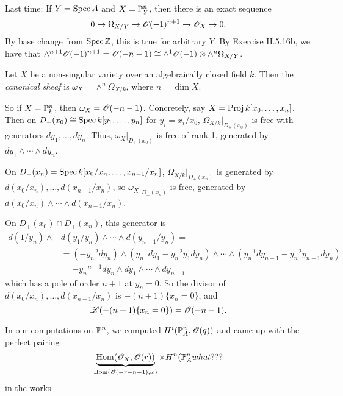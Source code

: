  \setcounter{lecture}{18}

 Last time: If $Y=\spec A$ and $X=\P^n_Y$, then there is an exact
 sequence
 \[
    0\to \Omega_{X/Y} \to \O(-1)^{n+1} \to \O_X\to 0.
 \]
  By base change from $\spec \Z$, this is true for arbitrary $Y$.
  By Exercise II.5.16b, we have that $\wedge^{n+1}\O(-1)^{n+1} =
  \O(-n-1)\cong \wedge^1 \O(-1)\otimes \wedge^n
  \Omega_{X/Y}$.

  \begin{definition}
  Let $X$ be a non-singular variety over an algebraically closed
  field $k$.  Then the \emph{canonical sheaf} is $\omega_X =
  \wedge^n\Omega_{X/k}$, where $n=\dim X$.
  \end{definition}

 So if $X=\P^n_k$, then $\omega_X=\O(-n-1)$.  Concretely, say
 $X=\proj k[x_0,\dots,x_n]$.  Then on $D_+(x_0)\cong \spec
 k[y_1,\dots,y_n]$ for $y_i=x_i/x_0$, $\Omega_{X/k}|_{D_+(x_0)}$ is
 free with generators $dy_1,\dots, dy_n$.  Thus,
 $\omega_X|_{D_+(x_0)}$ is free of rank 1, generated by
 $dy_1\wedge\cdots\wedge dy_n$.

 On $D_+(x_n) = \spec k[x_0/x_n,\dots,x_{n-1}/x_n]$,
 $\Omega_{X/k}|_{D_+(x_n)}$ is generated by $d(x_0/x_n),\dots,
 d(x_{n-1}/x_n)$, so $\omega_{X}|_{D_+(x_n)}$ is free, generated
 by $d(x_0/x_n)\wedge \cdots \wedge d(x_{n-1}/x_n)$.

 On $D_+(x_0)\cap D_+(x_n)$, this generator is
 \begin{align*}
  d(1/y_n)\wedge &d(y_1/y_n)\wedge\cdots \wedge d(y_{n-1}/y_n) =\\
   &=
    (-y_n^{-2}dy_n)\wedge
    (y_n^{-1}dy_1-y_n^{-2}y_1dy_n)\wedge\cdots\wedge(y_n^{-1}dy_{n-1}-y_n^{-2}y_{n-1}dy_n)\\
   &= -y_n^{-n-1} dy_n\wedge dy_1\wedge \cdots \wedge dy_{n-1}
  \end{align*}
  which has a pole of order $n+1$ at $y_n=0$.  So the divisor of $d(x_0/x_n),\dots,
 d(x_{n-1}/x_n)$ is $-(n+1)\{x_n=0\}$, and
 \[
    \L(-(n+1)\{x_n=0\}) = \O(-n-1).
 \]

 \vspace{3mm}

 In our computations on $\P^n$, we computed $H^i(\P^n_A,\O(q))$
 and came up with the perfect pairing
 \[
    \underbrace{\hom(\O_X,\O(r))}_{\hom(\O(-r-n-1),\omega)}\times
    H^n(\P^n_A what???
 \]
 in the works

